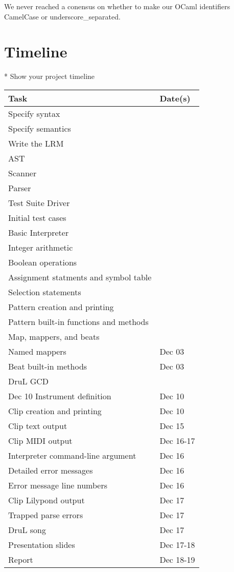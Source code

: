 We never reached a conensus on whether to make our OCaml identifiers CamelCase or underscore\_separated.

\section{Timeline}
* Show your project timeline

\begin{tabular}{ | l | l | } \hline
	\textbf{Task} & \textbf{Date(s)} \\ \hline \hline
	Specify syntax & \\ \hline
	Specify semantics & \\ \hline
	Write the LRM & \\ \hline
	AST & \\ \hline
	Scanner & \\ \hline
	Parser & \\ \hline
	Test Suite Driver & \\ \hline
	Initial test cases & \\ \hline
	Basic Interpreter & \\ \hline
	Integer arithmetic & \\ \hline
	Boolean operations & \\ \hline
	Assignment statments and symbol table & \\ \hline
	Selection statements & \\ \hline
	Pattern creation and printing & \\ \hline
	Pattern built-in functions and methods & \\ \hline
	Map, mappers, and beats & \\ \hline
	Named mappers & Dec 03\\ \hline
	Beat built-in methods & Dec 03\\ \hline
	DruL GCD & \\ Dec 10 \hline
	Instrument definition & Dec 10\\ \hline
	Clip creation and printing & Dec 10\\ \hline
	Clip text output & Dec 15 \\ \hline
	Clip MIDI output & Dec 16-17 \\ \hline
	Interpreter command-line argument & Dec 16 \\ \hline
	Detailed error messages & Dec 16 \\ \hline
	Error message line numbers & Dec 16 \\ \hline
	Clip Lilypond output & Dec 17 \\ \hline
	Trapped parse errors & Dec 17 \\ \hline
	DruL song & Dec 17 \\ \hline
	Presentation slides & Dec 17-18 \\ \hline
	Report & Dec 18-19 \\ \hline
\end{tabular}

